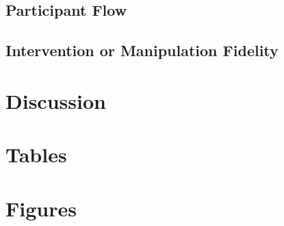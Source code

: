 \documentclass[a4paper,man,apacite,natbib,12pt]{apa6}\usepackage[]{graphicx}\usepackage[]{color}
\begin{document}
\subsection{Participant Flow}


\subsection{Intervention or Manipulation Fidelity}



\section{Discussion}
\nocite{A}\nocite{*}

\section{Tables}
\pagebreak
\section{Figures}
\pagebreak

\end{document}
